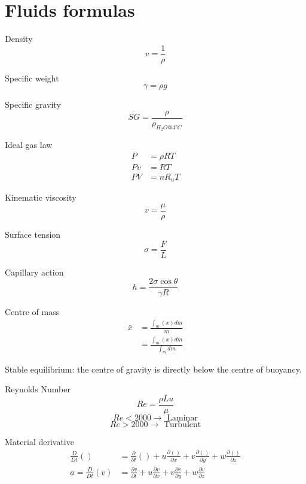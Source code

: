 \documentclass[class=report, crop=false, 12pt,a4paper]{standalone}
\begin{document}
\section{Fluids formulas}
Density
\begin{equation}
  v = \frac{1}{\rho}
\end{equation}

Specific weight
\begin{equation}
  \gamma = \rho g
\end{equation}

Specific gravity
\begin{equation}
  SG = \frac{\rho}{\rho_{H_2O @ 4\si{\degree}C}}
\end{equation}

Ideal gas law
\begin{align}
  P &= \rho R T\\
  Pv &= RT\\
  PV &= n R_u T
\end{align}

Kinematic viscosity
\begin{equation}
  v = \frac{\mu}{\rho}
\end{equation}

Surface tension
\begin{equation}
  \sigma = \frac{F}{L}
\end{equation}

Capillary action
\begin{equation}
  h = \frac{2 \sigma \cos \theta}{\gamma R}
\end{equation}

Centre of mass
\begin{align}
  \bar{x} &= \frac{\int_m (x) dm}{m}\\
  &= \frac{\int_m (x)dm}{\int_m dm}
\end{align}

Stable equilibrium: the centre of gravity is directly below the centre of buoyancy.

Reynolds Number
\begin{equation}
  Re = \frac{\rho L u}{\mu}
\end{equation}
\[ Re < 2000 \rightarrow \textrm{ Laminar} \]
\[ Re > 2000 \rightarrow \textrm{ Turbulent} \]

Material derivative
\begin{align}
  \frac{D}{Dt}() &= \frac{\partial}{\partial t}() + u \frac{\partial()}{\partial x} + v \frac{\partial ()}{\partial y} + w\frac{\partial ()}{\partial z}\\
  \underline{a} = \frac{D}{Dt}(\underline{v}) &= \frac{\partial v}{\partial t} + u\frac{\partial v}{\partial x} + v\frac{\partial v}{\partial y} + w \frac{\partial v}{\partial z} 
\end{align}
\end{document}

